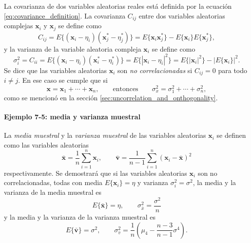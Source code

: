 \documentclass[a4paper]{report}
\newcommand{\x}{\mathbf{x}}
\begin{document}
La covarianza de dos variables aleatorias reales está definida por la ecuación \ref{eq:covariance_definition}. La covarianza \(C_{ij}\) entre dos variables aleatorias complejas \(\x_i\) y \(\x_j\) se define como
\[
 C_{ij}=E\{(\x_i-\eta_i)(\x^*_j-\eta^*_j)\}=E\{\x_i\x^*_j\}-E\{\x_i\}E\{\x^*_j\},
\]
y la varianza de la variable aleatoria compleja \(\x_i\) se define como
\[
 \sigma_i^2=C_{ii}=E\{(\x_i-\eta_i)(\x^*_i-\eta^*_i)\}=E\{|\x_i-\eta_i|^2\}=E\{|\x_i|^2\}-|E\{\x_i\}|^2.
\]
Se dice que las variables aleatorias \(\x_i\) son \emph{no correlacionadas} si \(C_{ij}=0\) para todo \(i\neq j\). En ese caso se cumple que si
\begin{equation}\label{eq:variance_sum_of_uncorrelated_rv}
 \x=\x_1+\cdots+\x_n,\qquad\textrm{entonces}\qquad\sigma_x^2=\sigma_1^2+\cdots+\sigma_n^2,
\end{equation}
como se mencionó en la sección \ref{sec:uncorrelation_and_onthogonality}.

\paragraph{Ejemplo 7-5: media y varianza muestral}\label{sec:sample_mean_and_variance}

La \emph{media muestral} y la \emph{varianza muestral} de las variables aleatorias \(\x_i\) se definen como las variables aleatorias
\begin{equation}\label{eq:sample_mean_and_variance}
 \bar{\x}=\frac{1}{n}\sum_{i=1}^{n}\x_i, \qquad \bar{\mathbf{v}}=\frac{1}{n-1}\sum_{i=1}^{n}(\x_i-\bar{\x})^2
\end{equation}
respectivamente. Se demostrará que si las variables aleatorias \(\x_i\) son no correlacionadas, todas con media \(E\{\x_i\}=\eta\) y varianza \(\sigma_i^2=\sigma^2\), la media y la varianza de la media muestral es
\[
 E\{\bar{\x}\}=\eta,\qquad \sigma_{\bar{x}}^2=\frac{\sigma^2}{n}
\]
y la media y la varianza de la varianza muestral es
\[
 E\{\bar{\mathbf{v}}\}=\sigma^2,\qquad \sigma^2_{\bar{v}}=\frac{1}{n}\left(\mu_4-\frac{n-3}{n-1}\sigma^4\right).
\]
\end{document}

